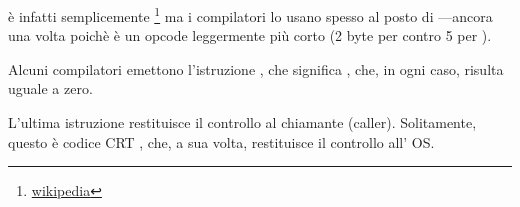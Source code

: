 
\XOR è infatti semplicemente \footnote{\href{http://go.yurichev.com/17118}{wikipedia}} ma i compilatori lo usano spesso al posto di
---ancora una volta poichè è un opcode leggermente più corto (2 byte per \XOR contro 5 per \MOV).

Alcuni compilatori emettono l'istruzione , che significa  \EAX {} \EAX, che, in ogni caso, risulta uguale a zero.

L'ultima istruzione \RET restituisce il controllo al chiamante (\gls{caller}). Solitamente, questo è codice \CCpp \ac{CRT} , che, a sua volta, restituisce il controllo all' \ac{OS}.
